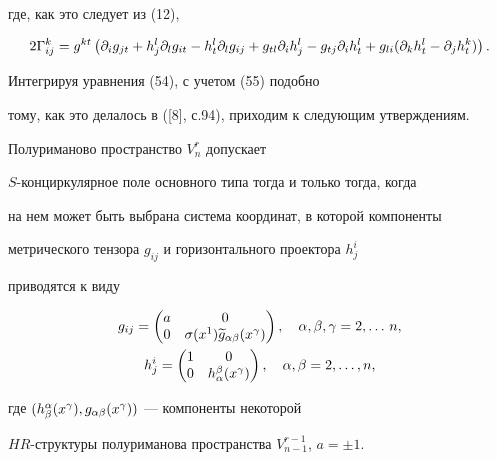 где, как это следует из (12),


\begin{equation}


2{\Ga}^k_{ij}=g^{kt}\left({\partial}_i g_{jt}+h_{j}^l{\partial}_l g_{it}-


h_{t}^l{\partial}_l g_{ij}+ g_{tl}{\partial}_i h_{j}^l


-g_{tj}{\partial}_i h_{t}^l+


g_{li}( {\partial}_k h_{t}^l- {\partial}_j h_{t}^k)\right).


\end{equation}


Интегрируя уравнения (54), с учетом (55) подобно


тому, как это делалось в ([8], с.94), приходим к следующим утверждениям.





\begin{thm}


Полуриманово пространство $V^r_n$ допускает


$S$-конциркулярное поле основного типа тогда и только тогда, когда


на нем может быть выбрана система координат, в которой компоненты


метрического тензора $g_{ij}$ и горизонтального проектора $h_{j}^{i}$


приводятся к виду


\begin{gather}


g_{ij}=\begin{pmatrix}


a & 0 \\


0 & \s( {x}^1)\ti {g}_{\a\be}({x}^{\ga})


\end{pmatrix},\quad \a,\be,\ga=2,\ds\,n, \\


%


h_{j}^i=\begin{pmatrix}


1 & 0 \\


0 & h_{\a}^{\be}({x}^{\ga})


\end{pmatrix},\quad {\a},{\be}=2,\ds, n, \notag


\end{gather}


где $(h_{\beta}^{\alpha}(x^{\gamma}),g_{\alpha\beta}(x^{\gamma}))$ --- компоненты некоторой


$HR$-структуры полуриманова пространства $V^{r-1}_{n-1}$, $a=\pm 1$.


\end{thm}





